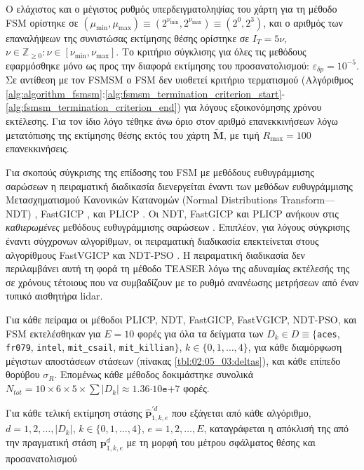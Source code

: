 Ο ελάχιστος και ο μέγιστος ρυθμός υπερδειγματοληψίας του χάρτη για τη μέθοδο
FSM ορίστηκε σε $(\mu_{\min},\mu_{\max}) \equiv
(2^{\nu_{\min}},2^{\nu_{\max}}) \equiv (2^0,2^3)$, και ο αριθμός των
επαναλήψεων της συνιστώσας εκτίμησης θέσης ορίστηκε σε $I_T=5\nu$, $\nu \in
\mathbb{Z}_{\geq 0}: \nu \in [\nu_{\min}, \nu_{\max}]$. Το κριτήριο σύγκλισης
για όλες τις μεθόδους εφαρμόσθηκε μόνο ως προς την διαφορά εκτίμησης του
προσανατολισμού: $\varepsilon_{\delta p} = 10^{-5}$. Σε αντίθεση με τον FSMSM ο
FSM δεν υιοθετεί κριτήριο τερματισμού (Αλγόριθμος
\ref{alg:algorithm_fsmsm}:\ref{alg:fsmsm_termination_criterion_start}-\ref{alg:fsmsm_termination_criterion_end})
για λόγους εξοικονόμησης χρόνου εκτέλεσης. Για τον ίδιο λόγο τέθηκε άνω όριο
στον αριθμό επανεκκινήσεων λόγω μετατόπισης της εκτίμησης θέσης εκτός του χάρτη
$\widetilde{\bm{M}}$, με τιμή $R_{\max} = 100$ επανεκκινήσεις.

Για σκοπούς σύγκρισης της επίδοσης του FSM με μεθόδους ευθυγράμμισης σαρώσεων η
πειραματική διαδικασία διενεργείται έναντι των μεθόδων ευθυγράμμισης
Μετασχηματισμού Κανονικών Κατανομών (Normal Distributions Transform---NDT)
\cite{Bibera,ndt_code}, FastGICP \cite{Segal2009a,fgicp_code}, και PLICP
\cite{Censi2008a,plicp_code}. Οι NDT, FastGICP και PLICP ανήκουν στις
\textit{καθιερωμένες} μεθόδους ευθυγράμμισης σαρώσεων
\cite{Koide2021a,Xu2018b,Sobreira2019b,Pishehvari2019b,Qingshan2019c,Pham2021b}.
Επιπλέον, για λόγους σύγκρισης έναντι σύγχρονων αλγορίθμων, οι πειραματική
διαδικασία επεκτείνεται στους αλγορίθμους FastVGICP
\cite{Koide2021a,fgicp_code} και NDT-PSO \cite{Bouraine2021,ndt_pso_code}. Η
πειραματική διαδικασία δεν περιλαμβάνει αυτή τη φορά τη μέθοδο TEASER λόγω της
αδυναμίας εκτέλεσής της σε χρόνους τέτοιους που να συμβαδίζουν με το ρυθμό
ανανέωσης μετρήσεων από έναν τυπικό αισθητήρα lidar.

Για κάθε πείραμα οι μέθοδοι PLICP, NDT, FastGICP, FastVGICP, NDT-PSO, και
FSM εκτελέσθηκαν για $E = 10$ φορές για όλα τα δείγματα των $D_k \in D
\equiv \{$\texttt{aces}, \texttt{fr079}, \texttt{intel}, \texttt{mit\_csail},
\texttt{mit\_killian}$\}$, $k \in \{0,1,\dots,4\}$, για κάθε διαμόρφωση
μέγιστων αποστάσεων στάσεων (πίνακας \ref{tbl:02:05_03:deltas}), και κάθε
επίπεδο θορύβου $\sigma_R$.  Επομένως κάθε μέθοδος δοκιμάστηκε συνολικά
$N_{tot} = 10 \times 6 \times 5 \times \sum |D_k|\approx
1.36$$\cdot10$$\texttt{e}$$+$$7$ φορές.

Για κάθε τελική εκτίμηση στάσης $\hat{\bm{p}}_{1,k,e}^{\prime d}$ που εξάγεται
από κάθε αλγόριθμο, $d = 1,2,\dots,|D_k|$, $k \in \{0,1,\dots,4\}$,
$e=1,2,\dots,E$, καταγράφεται η απόκλισή της από την πραγματική στάση
$\bm{p}_{1,k,e}^d$ με τη μορφή του μέτρου σφάλματος θέσης και προσανατολισμού

